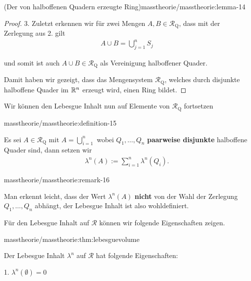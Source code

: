 \begin{lemma}{(Der von halboffenen Quadern erzeugte Ring)}{masstheorie/masstheorie:lemma-14}
\begin{proof}
\par
3. Zuletzt erkennen wir für zwei Mengen \(A,B \in \mathcal{R}_{\text{Q}}\), dass mit der Zerlegung aus 2. gilt
\begin{align*}
A\cup B = \bigcup_{j=1}^n S_j
\end{align*}
\par
und somit ist auch \(A\cup B\in\mathcal{R}_{\text{Q}}\) als Vereinigung halboffener Quader.

\par
Damit haben wir gezeigt, dass das Mengensystem \(\mathcal{R}_{\text{Q}}\), welches durch disjunkte halboffene Quader im \(\mathbb{R}^n\) erzeugt wird, einen Ring bildet.
\end{proof}

\par
Wir können den Lebesgue Inhalt nun auf Elemente von \(\mathcal{R}_{\text{Q}}\) fortsetzen
\begin{definition}{}{masstheorie/masstheorie:definition-15}



\par
Es sei \(A\in\mathcal{R}_{\text{Q}}\) mit \(A=\bigcup_{i=1}^n\) wobei \(Q_1,\ldots,Q_n\) \textbf{paarweise disjunkte} halboffene Quader sind, dann setzen wir
\begin{align*}
\lambda^n(A):=\sum_{i=1}^{n} \lambda^n(Q_i).
\end{align*}\end{definition}
\begin{remark}{}{masstheorie/masstheorie:remark-16}



\par
Man erkennt leicht, dass der Wert \(\lambda^n(A)\) \textbf{nicht} von der Wahl der Zerlegung \(Q_1,\ldots,Q_n\) abhängt, der Lebesgue Inhalt ist also wohldefiniert.
\end{remark}

\par
Für den Lebesgue Inhalt auf \(\mathcal{R}\) können wir folgende Eigenschaften zeigen.
\begin{theorem}{}{masstheorie/masstheorie:thm:lebesguevolume}



\par
Der Lebesgue Inhalt \(\lambda^n\) auf \(\mathcal{R}\) hat folgende Eigenschaften:

\par
1. \(\lambda^n(\emptyset) = 0\)


\end{theorem}
\end{lemma}
